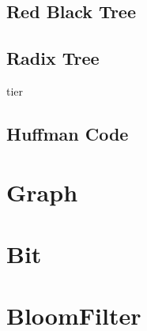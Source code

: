 \subsection{Red Black Tree}

\subsection{Radix Tree}

tier

\subsection{Huffman Code}

\section{Graph}

\section{Bit}

\section{BloomFilter}
